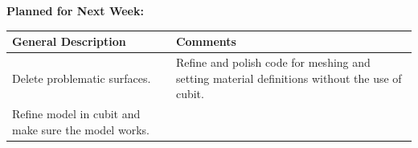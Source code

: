 \documentclass{article}
\begin{document}
\textbf{Planned for Next Week: }

\renewcommand{\arraystretch}{1.5}
\begin{table}[H]
    \centering
    \begin{tabularx}{0.95\textwidth} { 
        | >{\centering\arraybackslash}X
        | >{\centering\arraybackslash}X | }

    \hline
    \textbf{General Description} & \textbf{Comments} \\
    \hline
    Delete problematic surfaces. & Refine and polish code for meshing and setting material definitions without the use of cubit. \\
    \hline
    Refine model in cubit and make sure the model works.
    \end{tabularx}
\end{table}
\end{document}

